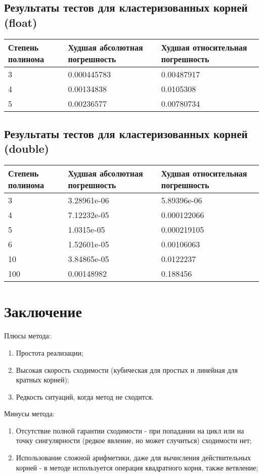 \documentclass[a4paper,12pt]{article}
\begin{document}
\subsection{Результаты тестов для кластеризованных корней (float)}
\begin{center}
  \begin{tabular}{|p{4.5cm}|p{5.5cm}|p{5.5cm}|}
  \hline
  \textbf{Степень полинома}  &  \textbf{Худшая абсолютная погрешность} & \textbf{Худшая относительная погрешность} \\
  \hline
  3 & 0.000445783 & 0.00487917 \\
  \hline
  4 & 0.00134838 & 0.0105308 \\
  \hline
  5 & 0.00236577 & 0.00780734 \\
  \hline
\end{tabular}
\label{tab:my_label_2}
\end{center}

\subsection{Результаты тестов для кластеризованных корней (double)}
\begin{center}
  \begin{tabular}{|p{4.5cm}|p{5.5cm}|p{5.5cm}|}
  \hline
  \textbf{Степень полинома}  &  \textbf{Худшая абсолютная погрешность} & \textbf{Худшая относительная погрешность} \\
  \hline
  3 & 3.28961e-06 & 5.89396e-06 \\
  \hline
  4 & 7.12232e-05 & 0.000122066 \\
  \hline
  5 & 1.0315e-05 & 0.000219105 \\
  \hline
  6 & 1.52601e-05 & 0.00106063 \\
  \hline
  10 & 3.84865e-05 & 0.0122237 \\
  \hline
  100 & 0.00148982 & 0.188456 \\
  \hline
\end{tabular}
\label{tab:my_label_2}
\end{center}



\newpage
\section{Заключение}
Плюсы метода:
\begin{enumerate}
    \item Простота реализации;
    \item Высокая скорость сходимости (кубическая для простых и линейная для кратных корней);
    \item Редкость ситуаций, когда метод не сходится.
\end{enumerate}
Минусы метода:
\begin{enumerate}
    \item Отсутствие полной гарантии сходимости - при попадании на цикл или на точку сингулярности (редкое явление, но может случиться) сходимости нет;
    \item Использование сложной арифметики, даже для вычисления действительных корней - в методе используется операция квадратного корня, также ветвление;
\end{enumerate}
\newpage
\end{document}
